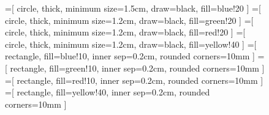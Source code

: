 \documentclass[a4paper]{article}
\begin{document}
\begin{figure}[htbp]
\centering

=[
    circle,
    thick,
    minimum size=1.5cm,
    draw=black,
    fill=blue!20
]
=[
    circle,
    thick,
    minimum size=1.2cm,
    draw=black,
    fill=green!20
]
=[
    circle,
    thick,
    minimum size=1.2cm,
    draw=black,
    fill=red!20
]
=[
    circle,
    thick,
    minimum size=1.2cm,
    draw=black,
    fill=yellow!40
]
=[
    rectangle,
    fill=blue!10,
    inner sep=0.2cm,
    rounded corners=10mm
]
=[
    rectangle,
    fill=green!10,
    inner sep=0.2cm,
    rounded corners=10mm
]
=[
    rectangle,
    fill=red!10,
    inner sep=0.2cm,
    rounded corners=10mm
]
=[
    rectangle,
    fill=yellow!40,
    inner sep=0.2cm,
    rounded corners=10mm
]


\end{figure}
\end{document}
